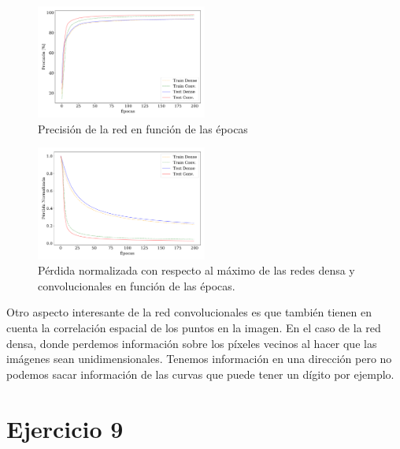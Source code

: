     \begin{figure}[H]
        \begin{small}
            \begin{center}
                \includegraphics[width=0.5\textwidth]{Graphs/ejer8_acc.pdf}
            \end{center}
            \caption{Precisión de la red en función de las épocas}
            \label{fig:ejer8_acc}
        \end{small}
    \end{figure}


    \begin{figure}[H]
        \begin{small}
            \begin{center}
                \includegraphics[width=0.5\textwidth]{Graphs/ejer8_loss.pdf}
            \end{center}
            \caption{Pérdida normalizada con respecto al máximo de las redes densa y convolucionales en función de las épocas. }
            \label{fig:ejer8_loss}
        \end{small}
    \end{figure}

    Otro aspecto interesante de la red convolucionales es que también tienen en cuenta  la correlación espacial de los puntos en la imagen. En el caso de la red densa, donde perdemos información sobre los píxeles vecinos al hacer que las imágenes sean unidimensionales. Tenemos información en una dirección pero no podemos sacar información de las curvas que puede tener un dígito por ejemplo.

\section*{Ejercicio 9}

